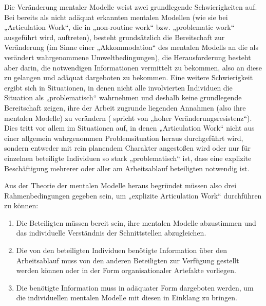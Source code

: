 Die Veränderung mentaler Modelle weist zwei grundlegende Schwierigkeiten auf. Bei bereits als nicht adäquat erkannten mentalen Modellen (wie sie bei „Articulation Work“, die in „non-routine work“ bzw. „problematic work“ ausgeführt wird, auftreten), besteht grundsätzlich die Bereitschaft zur Veränderung (im Sinne einer „Akkommodation“ des mentalen Modells an die als verändert wahrgenommene Umweltbedingungen), die Herausforderung besteht aber darin, die notwendigen Informationen vermittelt zu bekommen, also an diese zu gelangen und adäquat dargeboten zu bekommen. Eine weitere Schwierigkeit ergibt sich in Situationen, in denen nicht alle involvierten Individuen die Situation als „problematisch“ wahrnehmen und deshalb keine grundlegende Bereitschaft zeigen, ihre der Arbeit zugrunde liegenden Annahmen (also ihre mentalen Modelle) zu verändern (\citet{Ifenthaler06} spricht von „hoher Veränderungsresistenz“). Dies tritt vor allem im Situationen auf, in denen „Articulation Work“ nicht aus einer allgemein wahrgenommen Problemsituation heraus durchgeführt wird, sondern entweder mit rein planendem Charakter angestoßen wird oder nur für einzelnen beteiligte Individuen so stark „problematisch“ ist, dass eine explizite Beschäftigung mehrerer oder aller am Arbeitsablauf beteiligten notwendig ist. 

Aus der Theorie der mentalen Modelle heraus begründet müssen also drei Rahmenbedingungen gegeben sein, um „explizite Articulation Work“ durchführen zu können:
\begin{enumerate}
	\item Die Beteiligten müssen bereit sein, ihre mentalen Modelle abzustimmen und das individuelle Verständnis der Schnittstellen abzugleichen.
	\item Die von den beteiligten Individuen benötigte Information über den Arbeitsablauf muss von den anderen Beteiligten zur Verfügung gestellt werden können oder in der Form organisationaler Artefakte vorliegen.
	\item Die benötigte Information muss in adäquater Form dargeboten werden, um  die individuellen mentalen Modelle mit diesen in Einklang zu bringen.
\end{enumerate}

